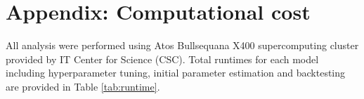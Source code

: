 \section{Appendix: Computational cost}\label{appendix_d}
\setcounter{table}{0}
\renewcommand{\thetable}{D\arabic{table}}
\setcounter{figure}{0}
\renewcommand{\thefigure}{D\arabic{figure}}

All analysis were performed using Atos Bullsequana X400 supercomputing cluster provided by IT Center for Science (CSC). Total runtimes for each model including hyperparameter tuning, initial parameter estimation and backtesting are provided in Table \ref{tab:runtime}.

